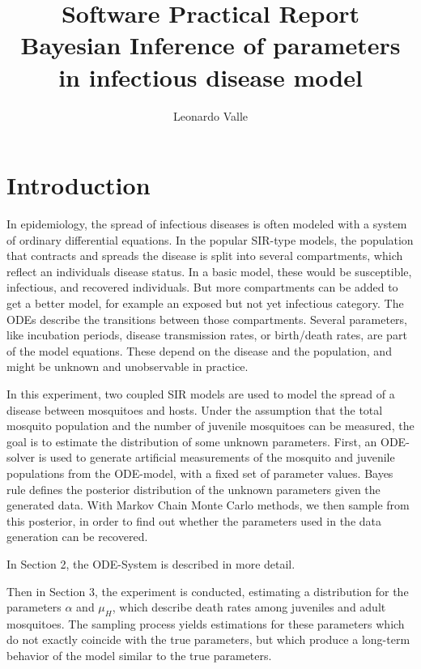 \documentclass{article}
\begin{document}
\title{Software Practical Report\\\large Bayesian Inference of parameters in infectious disease model}
\author{Leonardo Valle}
%

%
\maketitle              %
%

\newpage

\tableofcontents
\section{Introduction}
In epidemiology, the spread of infectious diseases is often modeled with a system of ordinary differential equations. 
In the popular SIR-type models, the population that contracts and spreads the disease is split into several compartments, which reflect an individuals disease status. In a basic model, these would be susceptible, infectious, and recovered individuals. But more compartments can be added to get a better model, for example an exposed but not yet infectious category. The ODEs describe the transitions between those compartments. Several parameters, like incubation periods, disease transmission rates, or birth/death rates, are part of the model equations. These depend on the disease and the population, and might be unknown and unobservable in practice. 

In this experiment, two coupled SIR models are used to model the spread of a disease between mosquitoes and hosts. 
Under the assumption that the total mosquito population and the number of juvenile mosquitoes can be measured, the goal is to estimate the distribution of some unknown parameters. First, an ODE-solver is used to generate artificial measurements of the mosquito and juvenile populations from the ODE-model, with a fixed set of parameter values. Bayes rule defines the posterior distribution of the unknown parameters given the generated data. With Markov Chain Monte Carlo methods, we then sample from this posterior, in order to find out whether the parameters used in the data generation can be recovered. 

In Section 2, the ODE-System is described in more detail. 

Then in Section 3, the experiment is conducted, estimating a distribution for the parameters $\alpha$ and $\mu_H$, which describe death rates among juveniles and adult mosquitoes. The sampling process yields estimations for these parameters which do not exactly coincide with the true parameters, but which produce a long-term behavior of the model similar to the true parameters.
\end{document}
